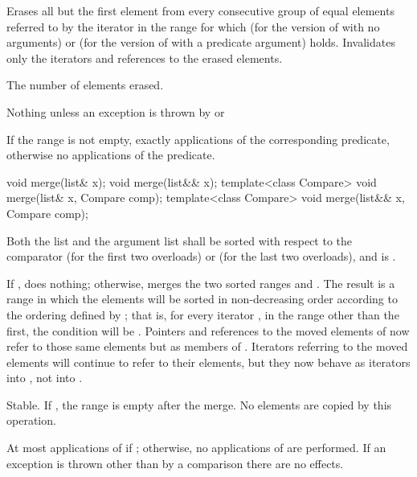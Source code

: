 \begin{itemdescr}
\pnum
\effects
Erases all but the first element from every
consecutive group of equal elements referred to by the iterator  in the range
 for which  (for the version of
 with no arguments) or  (for the version of
 with a predicate argument) holds.
Invalidates only the iterators and references to the erased elements.

\pnum
\returns
The number of elements erased.

\pnum
\throws
Nothing unless an exception is thrown by
or

\pnum
\complexity
If the range
is not empty, exactly
applications of the corresponding predicate,
otherwise no applications of the predicate.
\end{itemdescr}

%
\begin{itemdecl}
void merge(list& x);
void merge(list&& x);
template<class Compare> void merge(list& x, Compare comp);
template<class Compare> void merge(list&& x, Compare comp);
\end{itemdecl}

\begin{itemdescr}
\pnum
\expects
Both the list and the argument list
shall be sorted with respect to
the comparator  (for the first two overloads) or
 (for the last two overloads), and
 is .

\pnum
\effects
If , does nothing; otherwise, merges the two sorted ranges 
and . The result is a range in which the elements
will be sorted in non-decreasing order according to the ordering defined by ; that
is, for every iterator , in the range other than the first, the condition
 will be .
Pointers and references to the moved elements of  now refer to those same elements
but as members of . Iterators referring to the moved elements will continue to
refer to their elements, but they now behave as iterators into , not into
.

\pnum
\remarks
Stable. If , the range 
is empty after the merge.
No elements are copied by this operation.

\pnum
\complexity
At most
applications of  if
;
otherwise, no applications of  are performed.
If an exception is thrown other than by a comparison there are no effects.
\end{itemdescr}

